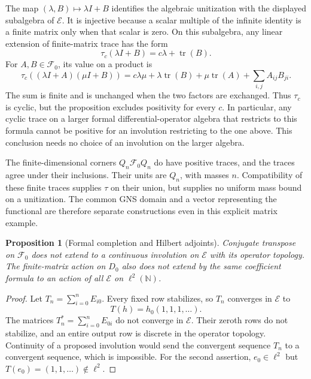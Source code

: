 \documentclass[11pt]{article}
\newtheorem{proposition}[theorem]{Proposition}
\theoremstyle{definition}
\theoremstyle{remark}
\numberwithin{equation}{section}
\begin{document}
The map $(\lambda,B)\mapsto\lambda I+B$ identifies the algebraic
unitization with the displayed subalgebra of $\mathscr E$.
It is injective because a scalar multiple of the infinite identity is
a finite matrix only when that scalar is zero.
On this subalgebra, any linear extension of finite-matrix trace has the
form
\[
 \tau_c(\lambda I+B)=c\lambda+\operatorname{tr}(B).
\]
For $A,B\in\mathscr F_0$, its value on a product is
\[
 \tau_c((\lambda I+A)(\mu I+B))
 =c\lambda\mu+\lambda\operatorname{tr}(B)
       +\mu\operatorname{tr}(A)+\sum_{i,j}A_{ij}B_{ji}.
\]
The sum is finite and is unchanged when the two factors are exchanged.
Thus $\tau_c$ is cyclic, but the proposition excludes positivity for every $c$.  In particular, any cyclic trace on
a larger formal differential-operator algebra that restricts to this
formula cannot be positive for an involution restricting to the one above.
This conclusion needs no choice of an involution on the larger algebra.

The finite-dimensional corners $Q_n\mathscr F_0Q_n$ do have positive
traces, and the traces agree under their inclusions.  Their units are
$Q_n$, with masses $n$.  Compatibility of these finite traces supplies
$\tau$ on their union, but supplies no uniform mass bound on a unitization.
The common GNS domain and a vector representing the functional are
therefore separate constructions even in this explicit matrix example.

\begin{proposition}[Formal completion and Hilbert adjoints]
\label{prop:weil-formal-adjoint}
Conjugate transpose on $\mathscr F_0$ does not extend to a continuous
involution on $\mathscr E$ with its operator topology.
The finite-matrix action on $D_0$ also does not extend by the same
coefficient formula to an action of all $\mathscr E$ on
$\ell^2(\mathbb N)$.
\end{proposition}
\begin{proof}
Let $T_n=\sum_{i=0}^nE_{i0}$.
Every fixed row stabilizes, so $T_n$ converges in $\mathscr E$ to
\[
 T(h)=h_0(1,1,1,\ldots).
\]
The matrices $T_n^*=\sum_{i=0}^nE_{0i}$ do not converge in
$\mathscr E$.  Their zeroth rows do not stabilize, and an entire output
row is discrete in the operator topology.  Continuity of a proposed
involution would send the convergent sequence $T_n$ to a convergent
sequence, which is impossible.
For the second assertion, $e_0\in\ell^2$ but
$T(e_0)=(1,1,\ldots)\notin\ell^2$.
\end{proof}
\end{document}
